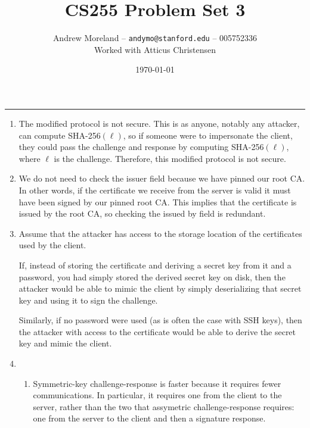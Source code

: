 \documentclass[12pt]{article}
\title{CS255 Problem Set 3}
\author{Andrew Moreland -- \texttt{andymo@stanford.edu} -- 005752336 \\ Worked with Atticus Christensen}
\date{\today}
\begin{document}
\maketitle
\rule{\linewidth}{0.4pt}

\clearpage

\vspace{-0.3in}
\setlength{\parskip}{10pt plus 1pt minus 1pt}
\pagestyle{fancy}

\begin{enumerate}

\item

  The modified protocol is not secure. This is as anyone, notably any attacker, can compute SHA-256$(\ell)$, so if someone were to impersonate the client, they could pass the challenge and response by computing SHA-256$(\ell)$, where $\ell$ is the challenge. Therefore, this modified protocol is not secure.

\item
  
  We do not need to check the issuer field because we have pinned our root CA. In other words, if the certificate we receive from the server is valid it must have been signed by our pinned root CA. This implies that the certificate is issued by the root CA, so checking the issued by field is redundant.
  
\item

  Assume that the attacker has access to the storage location of the certificates used by the client.

  If, instead of storing the certificate and deriving a secret key from it and a password, you had simply stored the derived secret key on disk, then the attacker would be able to mimic the client by simply deserializing that secret key and using it to sign the challenge.
  
  Similarly, if no password were used (as is often the case with SSH keys), then the attacker with access to the certificate would be able to derive the secret key and mimic the client.

\item

  \begin{enumerate}
  \item
    Symmetric-key challenge-response is faster because it requires fewer communications. In particular, it requires one from the client to the server, rather than the two that assymetric challenge-response requires: one from the server to the client and then a signature response.


\end{enumerate}
\end{enumerate}
\end{document}
